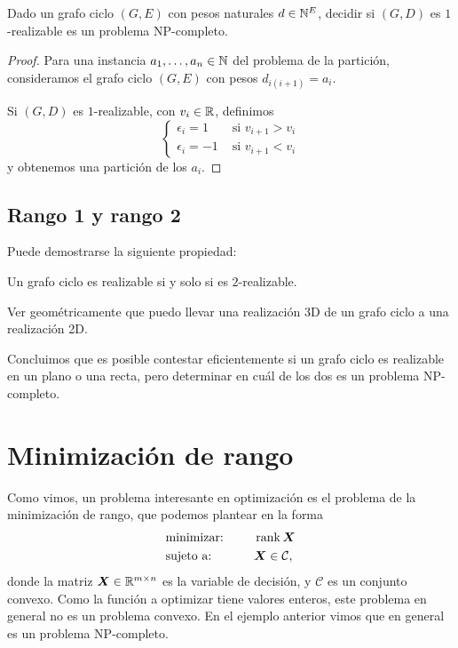 \begin{theorem}
Dado un grafo ciclo $(G, E)$ con pesos naturales $d \in \mathbb{N}^E$, decidir si $(G,D)$ es $1$-realizable es un problema NP-completo.
\end{theorem}

\begin{proof}
Para una instancia $a_1, \dots, a_n \in \mathbb{N}$ del problema de la partición, consideramos el grafo ciclo $(G,E)$ con pesos $d_{i(i+1)} = a_i$.

Si $(G,D)$ es $1$-realizable, con $v_i \in \mathbb{R}$, definimos
$$
\begin{cases}
\epsilon_i = 1 & \text{ si } v_{i+1} > v_i \\
\epsilon_i = -1 & \text{ si } v_{i+1} < v_i
\end{cases}
$$
y obtenemos una partición de los $a_i$.
\end{proof}

\subsection{Rango 1 y rango 2}

Puede demostrarse la siguiente propiedad:

\begin{center}
Un grafo ciclo es realizable si y solo si es $2$-realizable.
\end{center}

\begin{ejercicio} Ver geométricamente que puedo llevar una realización 3D de un grafo ciclo a una realización 2D.
\end{ejercicio}

Concluimos que es posible contestar eficientemente si un grafo ciclo es realizable en un plano o una recta, pero determinar en cuál de los dos es un problema NP-completo.

\section{Minimización de rango}

Como vimos, un problema interesante en optimización es el problema de la minimización de rango, que podemos plantear en la forma
\begin{alignat*}{2}
  & \text{minimizar: } & & \operatorname{rank} \bm{X}  \\
   & \text{sujeto a: } & \quad & \bm{X}  \in \mathcal{C},
\end{alignat*}
donde la matriz $\bm{X} \in \mathbb{R}^{m \times n}$ es la variable de decisión, y $\mathcal{C}$ es un conjunto convexo. Como la función a optimizar tiene valores enteros, este problema en general no es un problema convexo. En el ejemplo anterior vimos que en general es un problema NP-completo.

